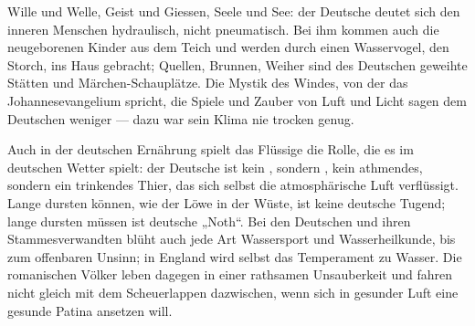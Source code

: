 Wille und Welle, Geist und Giessen, Seele und See: der Deutsche deutet sich den inneren Menschen hydraulisch, nicht pneumatisch. Bei ihm kommen auch die neugeborenen Kinder aus dem Teich und werden durch einen Wasservogel, den Storch, ins Haus gebracht; Quellen, Brunnen, Weiher sind des Deutschen geweihte Stätten und Märchen-Schauplätze. Die Mystik des Windes, von der das Johannesevangelium spricht, die Spiele und Zauber von Luft und Licht sagen dem Deutschen weniger — dazu war sein Klima nie trocken genug.
\par

Auch in der deutschen Ernährung spielt das Flüssige die Rolle, die es im deutschen Wetter spielt: der Deutsche ist kein , sondern , kein athmendes, sondern ein trinkendes Thier, das sich selbst die atmosphärische Luft verflüssigt. Lange dursten können, wie der Löwe in der Wüste, ist keine deutsche Tugend; lange dursten müssen ist deutsche „Noth“. Bei den Deutschen und ihren Stammesverwandten blüht auch jede Art Wassersport und Wasserheilkunde, bis zum offenbaren Unsinn; in England wird selbst das Temperament zu Wasser. Die romanischen Völker leben dagegen in einer rathsamen Unsauberkeit und fahren nicht gleich mit dem Scheuerlappen dazwischen, wenn sich in gesunder Luft eine gesunde Patina ansetzen will.
\par

